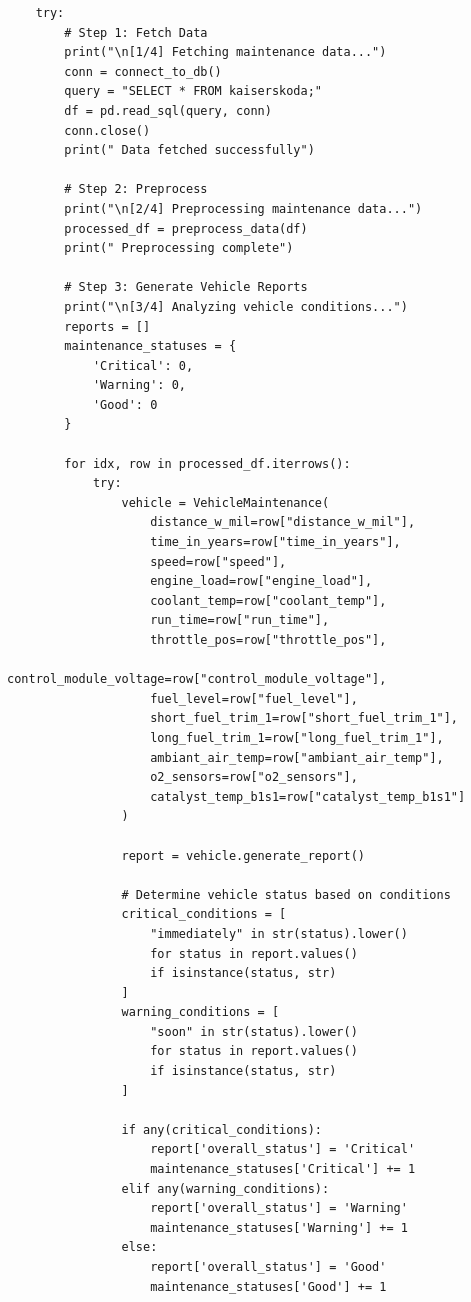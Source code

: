\begin{enumerate}
\begin{lstlisting}
    try:
        # Step 1: Fetch Data
        print("\n[1/4] Fetching maintenance data...")
        conn = connect_to_db()
        query = "SELECT * FROM kaiserskoda;"
        df = pd.read_sql(query, conn)
        conn.close()
        print(" Data fetched successfully")

        # Step 2: Preprocess
        print("\n[2/4] Preprocessing maintenance data...")
        processed_df = preprocess_data(df)
        print(" Preprocessing complete")

        # Step 3: Generate Vehicle Reports
        print("\n[3/4] Analyzing vehicle conditions...")
        reports = []
        maintenance_statuses = {
            'Critical': 0,
            'Warning': 0,
            'Good': 0
        }

        for idx, row in processed_df.iterrows():
            try:
                vehicle = VehicleMaintenance(
                    distance_w_mil=row["distance_w_mil"],
                    time_in_years=row["time_in_years"],
                    speed=row["speed"],
                    engine_load=row["engine_load"],
                    coolant_temp=row["coolant_temp"],
                    run_time=row["run_time"],
                    throttle_pos=row["throttle_pos"],
                    control_module_voltage=row["control_module_voltage"],
                    fuel_level=row["fuel_level"],
                    short_fuel_trim_1=row["short_fuel_trim_1"],
                    long_fuel_trim_1=row["long_fuel_trim_1"],
                    ambiant_air_temp=row["ambiant_air_temp"],
                    o2_sensors=row["o2_sensors"],
                    catalyst_temp_b1s1=row["catalyst_temp_b1s1"]
                )

                report = vehicle.generate_report()

                # Determine vehicle status based on conditions
                critical_conditions = [
                    "immediately" in str(status).lower()
                    for status in report.values()
                    if isinstance(status, str)
                ]
                warning_conditions = [
                    "soon" in str(status).lower()
                    for status in report.values()
                    if isinstance(status, str)
                ]

                if any(critical_conditions):
                    report['overall_status'] = 'Critical'
                    maintenance_statuses['Critical'] += 1
                elif any(warning_conditions):
                    report['overall_status'] = 'Warning'
                    maintenance_statuses['Warning'] += 1
                else:
                    report['overall_status'] = 'Good'
                    maintenance_statuses['Good'] += 1


\end{lstlisting}
\end{enumerate}
